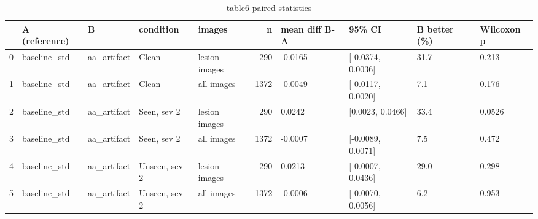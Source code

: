 \begin{table}
\caption{table6 paired statistics}
\label{tab:table6_paired_statistics}
\begin{tabular}{lllllrllll}
\toprule
 & A (reference) & B & condition & images & n & mean diff B-A & 95\% CI & B better (\%) & Wilcoxon p \\
\midrule
0 & baseline\_std & aa\_artifact & Clean & lesion images & 290 & -0.0165 & [-0.0374, 0.0036] & 31.7 & 0.213 \\
1 & baseline\_std & aa\_artifact & Clean & all images & 1372 & -0.0049 & [-0.0117, 0.0020] & 7.1 & 0.176 \\
2 & baseline\_std & aa\_artifact & Seen, sev 2 & lesion images & 290 & 0.0242 & [0.0023, 0.0466] & 33.4 & 0.0526 \\
3 & baseline\_std & aa\_artifact & Seen, sev 2 & all images & 1372 & -0.0007 & [-0.0089, 0.0071] & 7.5 & 0.472 \\
4 & baseline\_std & aa\_artifact & Unseen, sev 2 & lesion images & 290 & 0.0213 & [-0.0007, 0.0436] & 29.0 & 0.298 \\
5 & baseline\_std & aa\_artifact & Unseen, sev 2 & all images & 1372 & -0.0006 & [-0.0070, 0.0056] & 6.2 & 0.953 \\
\bottomrule
\end{tabular}
\end{table}
